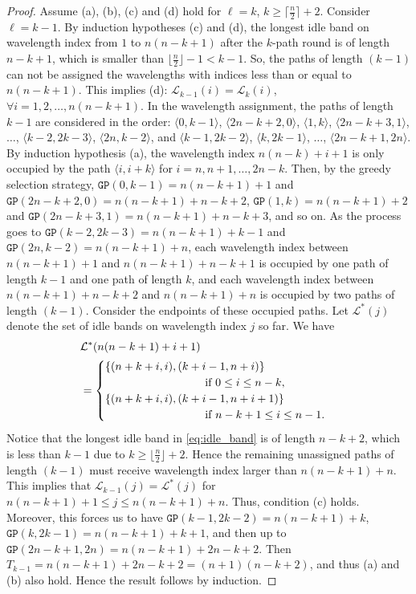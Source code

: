 \documentclass[journal,draftcls,onecolumn,12pt,twoside]{IEEEtran}
\newcommand{\GP}{{\mathtt{GP}}}
\begin{document}
\begin{proof}
Assume (a), (b), (c) and (d) hold for $\ell=k$, $k\geq \lceil\frac{n}{2}\rceil+2$.
Consider $\ell=k-1$.
By induction hypotheses (c) and (d), the longest idle band on wavelength index from $1$ to $n(n-k+1)$ after the $k$-path round is of length $n-k+1$, which is smaller than $\lfloor\frac{n}{2}\rfloor-1 < k-1$.
So, the paths of length $(k-1)$ can not be assigned the wavelengths with indices less than or equal to $n(n-k+1)$. 
This implies (d): $\mathcal{L}_{k-1}(i) = \mathcal{L}_{k}(i)$, $\forall i=1,2,\ldots, n(n-k+1)$.
In the wavelength assignment, the paths of length $k-1$ are considered in the order: $\langle 0,k-1\rangle$, $\langle 2n-k+2,0\rangle$, $\langle 1,k\rangle$, $\langle 2n-k+3,1\rangle$, $\ldots$, $\langle k-2,2k-3\rangle$, $\langle 2n,k-2\rangle$, and $\langle k-1,2k-2\rangle$, $\langle k,2k-1\rangle$, $\ldots$, $\langle 2n-k+1,2n\rangle$.
By induction hypothesis (a), the wavelength index $n(n-k)+i+1$ is only occupied by the path $\langle i,i+k\rangle$ for $i=n,n+1,\ldots,2n-k$.
Then, by the greedy selection strategy, $\GP(0,k-1)=n(n-k+1)+1$ and $\GP(2n-k+2,0)=n(n-k+1)+n-k+2$, $\GP(1,k)=n(n-k+1)+2$ and $\GP(2n-k+3,1)=n(n-k+1)+n-k+3$, and so on.
As the process goes to $\GP(k-2,2k-3)=n(n-k+1)+k-1$ and $\GP(2n,k-2)=n(n-k+1)+n$, 
each wavelength index between $n(n-k+1)+1$ and $n(n-k+1)+n-k+1$ is occupied by one path of length $k-1$ and one path of length $k$, and each wavelength index between $n(n-k+1)+n-k+2$ and $n(n-k+1)+n$ is occupied by two paths of length $(k-1)$.
Consider the endpoints of these occupied paths.
Let $\mathcal{L}^*(j)$ denote the set of idle bands on wavelength index $j$ so far.
We have
\begin{equation}\label{eq:idle_band}
\begin{split}
&\mathcal{L}^*(n(n-k+1)+i+1) \\ 
&= 
	\begin{cases}
	\{(n+k+i, i), (k+i-1,n+i)\} \\ \hspace*{3cm} \text{ if } 0\leq i\leq n-k, \\
	\{(n+k+i, i), (k+i-1,n+i+1)\} \\ \hspace*{3cm} \text{ if } n-k+1 \leq i \leq n-1.
	\end{cases}
\end{split}
\end{equation}
Notice that the longest idle band in \eqref{eq:idle_band} is of length $n-k+2$, which is less than $k-1$ due to $k\geq\lfloor\frac{n}{2}\rfloor+2$.
Hence the remaining unassigned paths of length $(k-1)$ must receive wavelength index larger than $n(n-k+1)+n$.
This implies that $\mathcal{L}_{k-1}(j)=\mathcal{L}^*(j)$ for $n(n-k+1)+1\leq j\leq n(n-k+1)+n$.
Thus, condition (c) holds.
Moreover, this forces us to have $\GP(k-1,2k-2)=n(n-k+1)+k$, $\GP(k,2k-1)=n(n-k+1)+k+1$, and then up to $\GP(2n-k+1,2n)=n(n-k+1)+2n-k+2$.
Then $T_{k-1}=n(n-k+1)+2n-k+2=(n+1)(n-k+2)$, and thus (a) and (b) also hold.
Hence the result follows by induction.
\end{proof}
\end{document}
